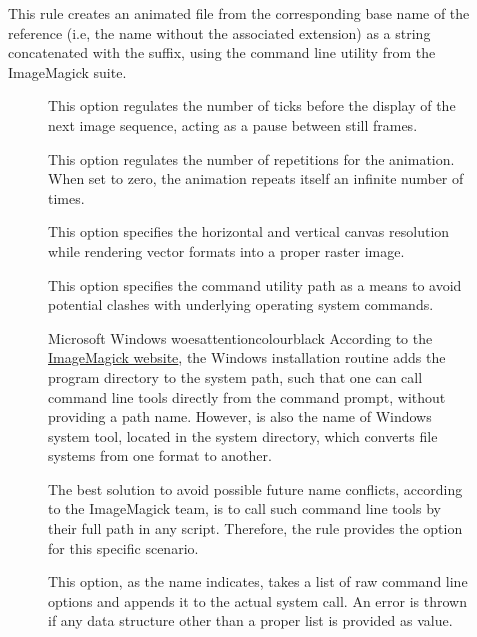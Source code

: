 \begin{description}
\item[]
This rule creates an animated  file from the corresponding base name of the  reference (i.e, the name without the associated extension) as a string concatenated with the  suffix, using the  command line utility from the ImageMagick suite.

\begin{description}
\item[] This option regulates the number of ticks before the display of the next image sequence, acting as a pause between still frames.

\item[] This option regulates the number of repetitions for the animation. When set to zero, the animation repeats itself an infinite number of times.

\item[] This option specifies the horizontal and vertical canvas resolution while rendering vector formats into a proper raster image.

\item[] This option specifies the command utility path as a means to avoid potential clashes with underlying operating system commands.

\begin{messagebox}{Microsoft Windows woes}{attentioncolour}{\icattention}{black}
\setlength{\parskip}{1em}
According to the \href{http://www.imagemagick.org/Usage/windows/}{ImageMagick website}, the Windows installation routine adds the program directory to the system path, such that one can call command line tools directly from the command prompt, without providing a path name. However,  is also the name of Windows system tool, located in the system directory, which converts file systems from one format to another.

The best solution to avoid possible future name conflicts, according to the ImageMagick team, is to call such command line tools by their full path in any script. Therefore, the  rule provides the  option for this specific scenario.
\end{messagebox}

\item[] This option, as the name indicates, takes a list of raw command line options and appends it to the actual system call. An error is thrown if any data structure other than a proper list is provided as value.
\end{description}


\end{description}
